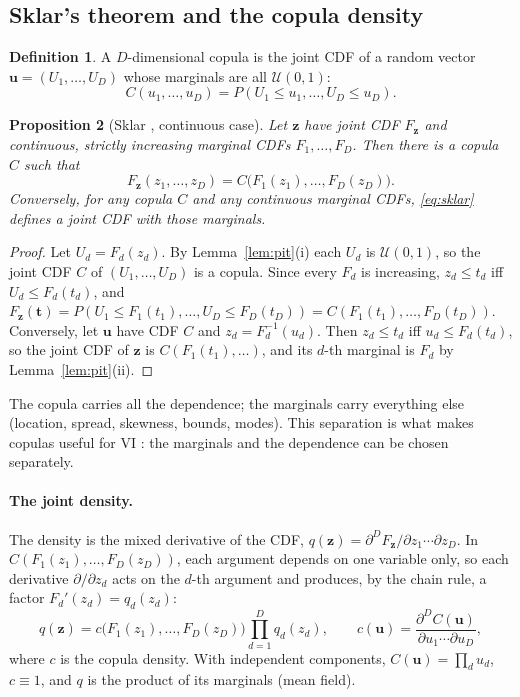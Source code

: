 \documentclass[11pt,a4paper]{article}
\numberwithin{equation}{section}
\theoremstyle{plain}
\newtheorem{proposition}{Proposition}[section]
\theoremstyle{definition}
\newtheorem{definition}[proposition]{Definition}
\theoremstyle{remark}
\newcommand{\z}{\mathbf{z}}
\newcommand{\uu}{\mathbf{u}}
\newcommand{\U}{\mathcal{U}}
\begin{document}
\subsection{Sklar's theorem and the copula density}
\begin{definition}
A $D$-dimensional copula is the joint CDF of a random vector $\uu=(U_1,\dots,U_D)$ whose marginals are all $\U(0,1)$:
\begin{equation*}
C(u_1,\dots,u_D)=P(U_1\le u_1,\dots,U_D\le u_D).
\end{equation*}
\end{definition}
\begin{proposition}[Sklar \cite{sklar1959,nelsen2006}, continuous case]
Let $\z$ have joint CDF $F_{\z}$ and continuous, strictly increasing marginal CDFs $F_1,\dots,F_D$. Then there is a copula $C$ such that
\begin{equation}
F_{\z}(z_1,\dots,z_D)=C\big(F_1(z_1),\dots,F_D(z_D)\big).
\label{eq:sklar}
\end{equation}
Conversely, for any copula $C$ and any continuous marginal CDFs, \eqref{eq:sklar} defines a joint CDF with those marginals.
\end{proposition}
\begin{proof}
Let $U_d=F_d(z_d)$. By Lemma~\ref{lem:pit}(i) each $U_d$ is $\U(0,1)$, so the joint CDF $C$ of $(U_1,\dots,U_D)$ is a copula. Since every $F_d$ is increasing, $z_d\le t_d$ iff $U_d\le F_d(t_d)$, and $F_{\z}(\mathbf t)=P(U_1\le F_1(t_1),\dots,U_D\le F_D(t_D))=C(F_1(t_1),\dots,F_D(t_D))$.
Conversely, let $\uu$ have CDF $C$ and $z_d=F_d^{-1}(u_d)$. Then $z_d\le t_d$ iff $u_d\le F_d(t_d)$, so the joint CDF of $\z$ is $C(F_1(t_1),\dots)$, and its $d$-th marginal is $F_d$ by Lemma~\ref{lem:pit}(ii).
\end{proof}
The copula carries all the dependence; the marginals carry everything else (location, spread, skewness, bounds, modes). This separation is what makes copulas useful for VI \cite{tran2015copula}: the marginals and the dependence can be chosen separately.

\paragraph{The joint density.} The density is the mixed derivative of the CDF, $q(\z)=\partial^DF_{\z}/\partial z_1\cdots\partial z_D$. In $C(F_1(z_1),\dots,F_D(z_D))$, each argument depends on one variable only, so each derivative $\partial/\partial z_d$ acts on the $d$-th argument and produces, by the chain rule, a factor $F_d'(z_d)=q_d(z_d)$:
\begin{equation}
q(\z)=c\big(F_1(z_1),\dots,F_D(z_D)\big)\prod_{d=1}^Dq_d(z_d),\qquad c(\uu)=\frac{\partial^DC(\uu)}{\partial u_1\cdots\partial u_D},
\label{eq:copula_joint}
\end{equation}
where $c$ is the copula density. With independent components, $C(\uu)=\prod_du_d$, $c\equiv1$, and $q$ is the product of its marginals (mean field).
\end{document}

